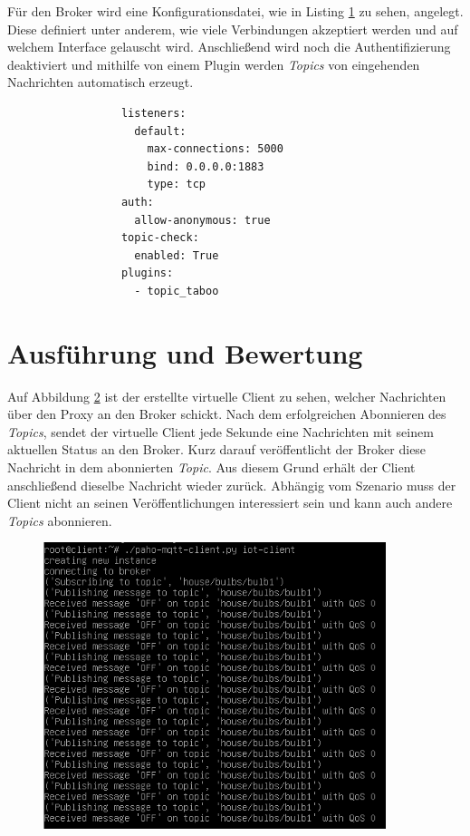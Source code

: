     Für den Broker wird eine Konfigurationsdatei, wie in Listing \ref{fig:broker_config} zu sehen, angelegt. Diese definiert unter anderem, wie viele Verbindungen akzeptiert werden und auf welchem Interface gelauscht wird. Anschließend wird noch die Authentifizierung deaktiviert und mithilfe von einem Plugin werden \emph{Topics} von eingehenden Nachrichten automatisch erzeugt. 
    \begin{figure}[h]
        \begin{lstlisting}
            listeners:
              default:
                max-connections: 5000
                bind: 0.0.0.0:1883
                type: tcp
            auth:
              allow-anonymous: true
            topic-check:
              enabled: True
            plugins:
              - topic_taboo
        \end{lstlisting}
        \label{fig:broker_config}
    \end{figure}

\section{Ausführung und Bewertung}
    Auf Abbildung \ref{fig:client_messages} ist der erstellte virtuelle Client zu sehen, welcher Nachrichten über den Proxy an den Broker schickt.
    Nach dem erfolgreichen Abonnieren des \emph{Topics}, sendet der virtuelle Client jede Sekunde eine Nachrichten mit seinem aktuellen Status an den Broker. Kurz darauf veröffentlicht der Broker diese Nachricht in dem abonnierten \emph{Topic}. Aus diesem Grund erhält der Client anschließend dieselbe Nachricht wieder zurück. Abhängig vom Szenario muss der Client nicht an seinen Veröffentlichungen interessiert sein und kann auch andere \emph{Topics} abonnieren.
    \begin{figure}[!h]%
        \centering
        \includegraphics[width=10cm]{tex/bilder/6_validierung/ClientMessages.png}
        \label{fig:client_messages}
    \end{figure}
    
